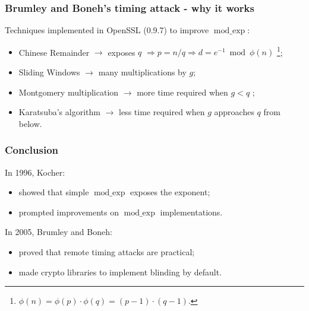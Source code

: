 \documentclass{beamer}
\DeclareMathOperator{\modexp}{mod\_exp}
\begin{document}
\begin{frame}
\frametitle{Brumley and Boneh's timing attack - why it works}

Techniques implemented in OpenSSL (0.9.7) to improve $\modexp$:
\begin{itemize}
  \item Chinese Remainder $\rightarrow$ exposes $q$ $\Rightarrow p = n / q \Rightarrow d = e^{-1} \bmod \phi(n)$ \footnote{$\phi(n) = \phi(p) \cdot \phi(q) = (p - 1) \cdot (q - 1).$};
  \item Sliding Windows \cite{bib:sliding} $\rightarrow$ many multiplications by $g$;
  \item Montgomery multiplication \cite{bib:montgomery} $\rightarrow$ more time required when $g < q$ \cite{bib:schindler};
  \item Karatsuba's algorithm $\rightarrow$ less time required when $g$ approaches $q$ from below.
\end{itemize}

\end{frame}
% 
% 
% 
\begin{frame}
\frametitle{Conclusion}

In 1996, Kocher:
\begin{itemize}
  \item showed that simple $\modexp$ exposes the exponent;
  \item prompted improvements on $\modexp$ implementations.
\end{itemize}

In 2005, Brumley and Boneh:
\begin{itemize}
  \item proved that remote timing attacks are practical;
  \item made crypto libraries to implement blinding by default.
\end{itemize}

\end{frame}
\end{document}
